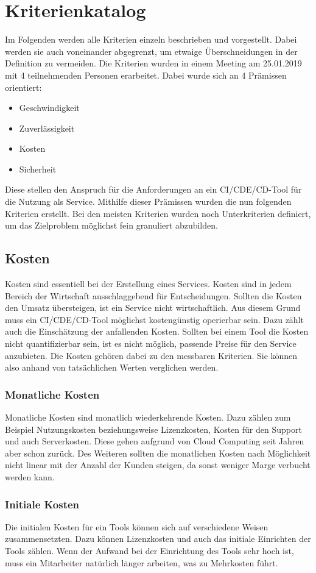 \section{Kriterienkatalog}
Im Folgenden werden alle Kriterien einzeln beschrieben und vorgestellt. Dabei werden sie auch voneinander abgegrenzt, um etwaige Überschneidungen in der Definition zu vermeiden. Die Kriterien wurden in einem Meeting am 25.01.2019 mit 4 teilnehmenden Personen erarbeitet. Dabei wurde sich an 4 Prämissen orientiert: 
\begin{itemize}
	\item Geschwindigkeit
	\item Zuverlässigkeit
	\item Kosten
	\item Sicherheit
\end{itemize}
Diese stellen den Anspruch für die Anforderungen an ein \ac{CI}/\ac{CDE}/\ac{CD}-Tool für die Nutzung als Service. Mithilfe dieser Prämissen wurden die nun folgenden Kriterien erstellt. Bei den meisten Kriterien wurden noch Unterkriterien definiert, um das Zielproblem möglichst fein granuliert abzubilden. 
\subsection{Kosten}
Kosten sind essentiell bei der Erstellung eines Services. Kosten sind in jedem Bereich der Wirtschaft ausschlaggebend für Entscheidungen. Sollten die Kosten den Umsatz übersteigen, ist ein Service nicht wirtschaftlich. Aus diesem Grund muss ein \ac{CI}/\ac{CDE}/\ac{CD}-Tool möglichst kostengünstig operierbar sein. Dazu zählt auch die Einschätzung der anfallenden Kosten. Sollten bei einem Tool die Kosten nicht quantifizierbar sein, ist es nicht möglich, passende Preise für den Service anzubieten. Die Kosten gehören dabei zu den messbaren Kriterien. Sie können also anhand von tatsächlichen Werten verglichen werden.
\subsubsection{Monatliche Kosten}
Monatliche Kosten sind monatlich wiederkehrende Kosten. Dazu zählen zum Beispiel Nutzungskosten beziehungsweise Lizenzkosten, Kosten für den Support und auch Serverkosten. Diese gehen aufgrund von Cloud Computing seit Jahren aber schon zurück. Des Weiteren sollten die monatlichen Kosten nach Möglichkeit nicht linear mit der Anzahl der Kunden steigen, da sonst weniger Marge verbucht werden kann.
\subsubsection{Initiale Kosten}
Die initialen Kosten für ein Tools können sich auf verschiedene Weisen zusammensetzten. Dazu können Lizenzkosten und auch das initiale Einrichten der Tools zählen. Wenn der Aufwand bei der Einrichtung des Tools sehr hoch ist, muss ein Mitarbeiter natürlich länger arbeiten, was zu Mehrkosten führt. 
